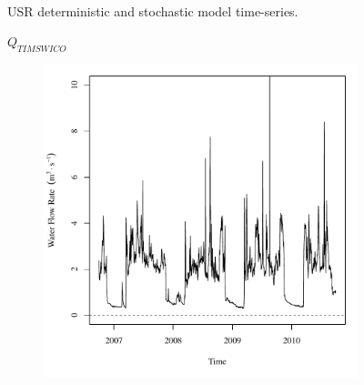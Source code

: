 \begin{linenumbers}
\begin{landscape}
\begin{figure}
\begin{subfigure}{0.7\textwidth}
		\end{subfigure}\\
		\caption{USR deterministic and stochastic model time-series.}
	\end{figure}
\end{landscape}
\subfiguremid
\begin{landscape}
	\begin{figure}
		\centering
		$ Q_{TIMSWICO} $
		\begin{subfigure}{0.7\textwidth}
			\centering
			\includegraphics[width=\textwidth]{"Figures/Results_USR/Deterministic/Q TIM"}
		\end{subfigure}%
		\begin{subfigure}{0.7\textwidth}
			\centering

\end{subfigure}
\end{figure}
\end{landscape}
\end{linenumbers}
